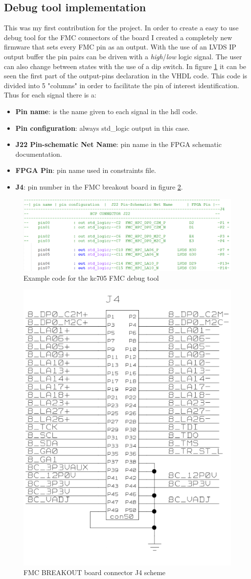 \subsection{Debug tool implementation}
This was my first contribution for the project.
In order to create a easy to use debug tool for the FMC connectors of the board I created a completely new firmware that sets every FMC pin as an output.
With the use of an LVDS IP output buffer the pin pairs can be driven with a \textit{high}/\textit{low} logic signal.
The user can also change between states with the use of a dip switch.
In figure \ref{fig:debug1} it can be seen the first part of the output-pins declaration in the VHDL code.
This code is divided into 5 "columns" in order to facilitate the pin of interest identification. Thus for each signal there is a:
\begin{itemize}
	\item \textbf{Pin name}: is the name given to each signal in the hdl code.
	\item \textbf{Pin configuration}: always std\_logic output in this case.
	\item \textbf{J22 Pin-schematic Net Name}: pin name in the FPGA schematic documentation. 
	\item \textbf{FPGA Pin}: pin name used in constraints file. 
	\item \textbf{J4}: pin number in the FMC breakout board in figure \ref{fig:debug2}. 
\end{itemize}     
\begin{figure}[H]
	\centering
	\includegraphics[width=0.7\linewidth]{IMG/ch3/DEBUG1}
	\caption{Example code for the kc705 FMC debug tool}
	\label{fig:debug1}
\end{figure}
\begin{figure}[H]
	\centering
	\includegraphics[width=0.35\linewidth]{IMG/ch3/DEBUG2}
	\caption{FMC BREAKOUT board connector J4 scheme}
	\label{fig:debug2}
\end{figure}
